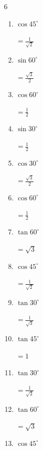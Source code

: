 \begin{multicols}{6}
\begin{enumerate}
        $\displaystyle =\frac{1}{\sqrt{2}}$

  \item $\displaystyle \cos{45^\circ}$

        $\displaystyle =\frac{1}{\sqrt{2}}$

  \item $\displaystyle \sin{60^\circ}$

        $\displaystyle =\frac{\sqrt{3}}{2}$

  \item $\displaystyle \cos{60^\circ}$

        $\displaystyle =\frac{1}{2}$

  \item $\displaystyle \sin{30^\circ}$

        $\displaystyle =\frac{1}{2}$

  \item $\displaystyle \cos{30^\circ}$

        $\displaystyle =\frac{\sqrt{3}}{2}$

  \item $\displaystyle \cos{60^\circ}$

        $\displaystyle =\frac{1}{2}$

  \item $\displaystyle \tan{60^\circ}$

        $\displaystyle =\sqrt{3}$

  \item $\displaystyle \cos{45^\circ}$

        $\displaystyle =\frac{1}{\sqrt{2}}$

  \item $\displaystyle \tan{30^\circ}$

        $\displaystyle =\frac{1}{\sqrt{3}}$

\columnbreak %

  \item $\displaystyle \tan{45^\circ}$

        $\displaystyle =1$

  \item $\displaystyle \tan{30^\circ}$

        $\displaystyle =\frac{1}{\sqrt{3}}$

  \item $\displaystyle \tan{60^\circ}$

        $\displaystyle =\sqrt{3}$

  \item $\displaystyle \cos{45^\circ}$


\end{enumerate}
\end{multicols}
